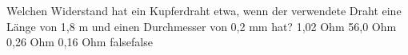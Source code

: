     {Welchen Widerstand hat ein Kupferdraht etwa, wenn der verwendete Draht eine Länge von 1,8 m und einen Durchmesser von 0,2 mm hat?}
    {1,02 Ohm}
    {56,0 Ohm}
    {0,26 Ohm}
    {0,16 Ohm}
    {false}{false}
